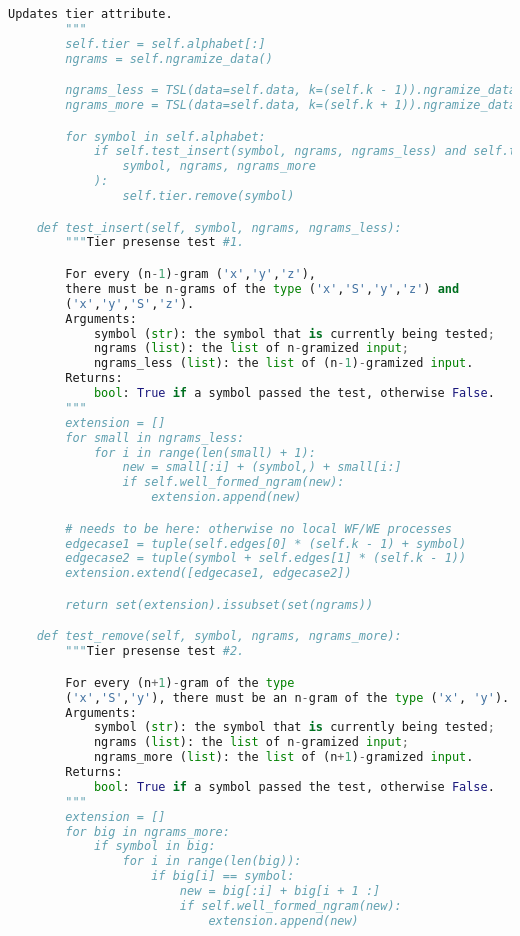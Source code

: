 \begin{lstlisting}[language=Python]
        Updates tier attribute.
        """
        self.tier = self.alphabet[:]
        ngrams = self.ngramize_data()

        ngrams_less = TSL(data=self.data, k=(self.k - 1)).ngramize_data()
        ngrams_more = TSL(data=self.data, k=(self.k + 1)).ngramize_data()

        for symbol in self.alphabet:
            if self.test_insert(symbol, ngrams, ngrams_less) and self.test_remove(
                symbol, ngrams, ngrams_more
            ):
                self.tier.remove(symbol)

    def test_insert(self, symbol, ngrams, ngrams_less):
        """Tier presense test #1.

        For every (n-1)-gram ('x','y','z'),
        there must be n-grams of the type ('x','S','y','z') and
        ('x','y','S','z').
        Arguments:
            symbol (str): the symbol that is currently being tested;
            ngrams (list): the list of n-gramized input;
            ngrams_less (list): the list of (n-1)-gramized input.
        Returns:
            bool: True if a symbol passed the test, otherwise False.
        """
        extension = []
        for small in ngrams_less:
            for i in range(len(small) + 1):
                new = small[:i] + (symbol,) + small[i:]
                if self.well_formed_ngram(new):
                    extension.append(new)

        # needs to be here: otherwise no local WF/WE processes
        edgecase1 = tuple(self.edges[0] * (self.k - 1) + symbol)
        edgecase2 = tuple(symbol + self.edges[1] * (self.k - 1))
        extension.extend([edgecase1, edgecase2])

        return set(extension).issubset(set(ngrams))

    def test_remove(self, symbol, ngrams, ngrams_more):
        """Tier presense test #2.

        For every (n+1)-gram of the type
        ('x','S','y'), there must be an n-gram of the type ('x', 'y').
        Arguments:
            symbol (str): the symbol that is currently being tested;
            ngrams (list): the list of n-gramized input;
            ngrams_more (list): the list of (n+1)-gramized input.
        Returns:
            bool: True if a symbol passed the test, otherwise False.
        """
        extension = []
        for big in ngrams_more:
            if symbol in big:
                for i in range(len(big)):
                    if big[i] == symbol:
                        new = big[:i] + big[i + 1 :]
                        if self.well_formed_ngram(new):
                            extension.append(new)


\end{lstlisting}
